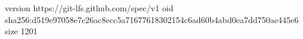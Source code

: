 version https://git-lfs.github.com/spec/v1
oid sha256:d519e97058e7c26ac8ecc5a71677618302154c6ad60b4abd0ea7dd750ae445e6
size 1201
